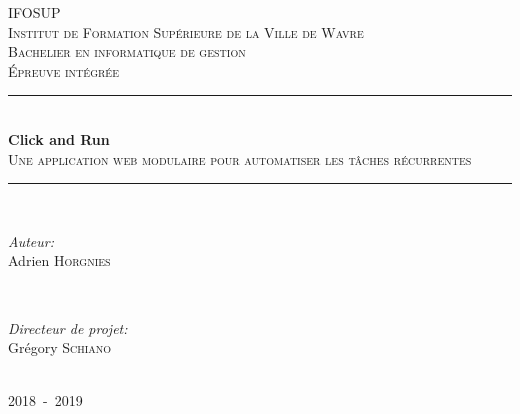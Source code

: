 \begin{titlepage}


    \newcommand{\HRule}{\rule{\linewidth}{0.5mm}} %

    \center


    \textsc{\LARGE IFOSUP}\\[0.5cm]
    \textsc{\large Institut de Formation Supérieure de la Ville de Wavre}\\[1.5cm]
    \textsc{\Large Bachelier en informatique de gestion}\\[0.5cm]
    \textsc{\large Épreuve intégrée}\\[0.5cm]


    \HRule \\[0.4cm]
    { \huge \bfseries Click and Run}\\[0.4cm]
    \textsc{\large Une application web modulaire pour automatiser les tâches récurrentes}\\[0.5cm]
    \HRule \\[1.5cm]


    \begin{minipage}{0.4\textwidth}
        \begin{flushleft} \large
        \emph{Auteur:}\\
        Adrien \textsc{Horgnies}
        \end{flushleft}
    \end{minipage}
    ~
    \begin{minipage}{0.4\textwidth}
        \begin{flushright} \large
        \emph{Directeur de projet:} \\
        Grégory \textsc{Schiano}
        \end{flushright}
    \end{minipage}\\[2cm]


    {\large 2018~-~2019}\\[2cm]


    \vfill

\end{titlepage}
